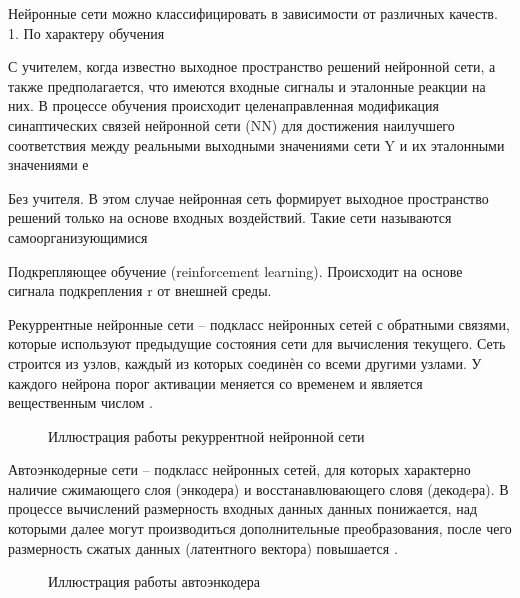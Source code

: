 Нейронные сети можно классифицировать в зависимости от различных качеств.
1. По характеру обучения

С учителем, когда известно выходное пространство решений нейронной сети, а также предполагается, что имеются входные сигналы и
эталонные реакции на них. В процессе обучения происходит целенаправленная модификация синаптических связей нейронной сети (NN)
для достижения наилучшего соответствия между реальными выходными значениями сети Y и их эталонными значениями е

Без учителя. В этом случае нейронная сеть формирует выходное
пространство решений только на основе входных воздействий. Такие
сети называются самоорганизующимися

Подкрепляющее обучение (reinforcement learning). Происходит на основе сигнала подкрепления r от внешней среды.

Рекуррентные нейронные сети -- подкласс нейронных сетей с обратными связями, которые
используют предыдущие состояния сети для вычисления текущего. Сеть строится из узлов, каждый
из которых соединѐн со всеми другими узлами. У каждого нейрона порог активации меняется со
временем и является вещественным числом \cite{bguir_rnn}. 
\begin{figure}[H]
	\caption{Иллюстрация работы рекуррентной нейронной сети}
\end{figure}

Автоэнкодерные сети -- подкласс нейронных сетей, для которых характерно наличие сжимающего слоя (энкодера) и восстанавлювающего словя (декодeра).
В процессе вычислений размерность входных данных данных понижается, над которыми далее могут производиться дополнительные преобразования, 
после чего размерность сжатых данных (латентного вектора) повышается \cite{vae}.
\begin{figure}[H]
	\caption{Иллюстрация работы автоэнкодера}
\end{figure}

